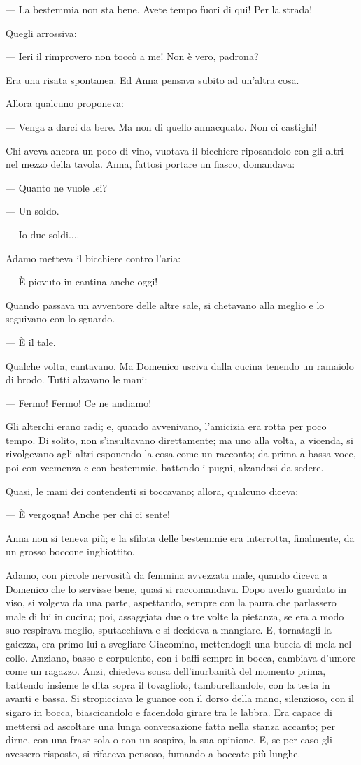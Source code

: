 — La bestemmia non sta bene. Avete tempo fuori di qui! Per la strada!

Quegli arrossiva:

— Ieri il rimprovero non toccò a me! Non è vero, padrona?

Era una risata spontanea. Ed Anna pensava subito ad un’altra cosa.

Allora qualcuno proponeva:

— Venga a darci da bere. Ma non di quello annacquato. Non ci castighi!

Chi aveva ancora un poco di vino, vuotava il bicchiere riposandolo con gli altri nel mezzo della tavola. Anna, fattosi portare un fiasco, domandava:

— Quanto ne vuole lei?

— Un soldo.

— Io due soldi....

Adamo metteva il bicchiere contro l’aria:

— È piovuto in cantina anche oggi!

Quando passava un avventore delle altre sale, si chetavano alla meglio e lo seguivano con lo sguardo.

— È il tale.

Qualche volta, cantavano. Ma Domenico usciva dalla cucina tenendo un ramaiolo di brodo. Tutti alzavano le mani:

— Fermo! Fermo! Ce ne andiamo!

Gli alterchi erano radi; e, quando avvenivano, l’amicizia era rotta per poco tempo. Di solito, non s’insultavano direttamente; ma uno alla volta, a vicenda, si rivolgevano agli altri esponendo la cosa come un racconto; da prima a bassa voce, poi con veemenza e con bestemmie, battendo i pugni, alzandosi da sedere.

Quasi, le mani dei contendenti si toccavano; allora, qualcuno diceva:

— È vergogna! Anche per chi ci sente!

Anna non si teneva più; e la sfilata delle bestemmie era interrotta, finalmente, da un grosso boccone inghiottito.

Adamo, con piccole nervosità da femmina avvezzata male, quando diceva a Domenico che lo servisse bene, quasi si raccomandava. Dopo averlo guardato in viso, si volgeva da una parte, aspettando, sempre con la paura che parlassero male di lui in cucina; poi, assaggiata due o tre volte la pietanza, se era a modo suo respirava meglio, sputacchiava e si decideva a mangiare. E, tornatagli la gaiezza, era primo lui a svegliare Giacomino, mettendogli una buccia di mela nel collo. Anziano, basso e corpulento, con i baffi sempre in bocca, cambiava d’umore come un ragazzo. Anzi, chiedeva scusa dell’inurbanità del momento prima, battendo insieme le dita sopra il tovagliolo, tamburellandole, con la testa in avanti e bassa. Si stropicciava le guance con il dorso della mano, silenzioso, con il sigaro in bocca, biascicandolo e facendolo girare tra le labbra. Era capace di mettersi ad ascoltare una lunga conversazione fatta nella stanza accanto; per dirne, con una frase sola o con un sospiro, la sua opinione. E, se per caso gli avessero risposto, si rifaceva pensoso, fumando a boccate più lunghe.

